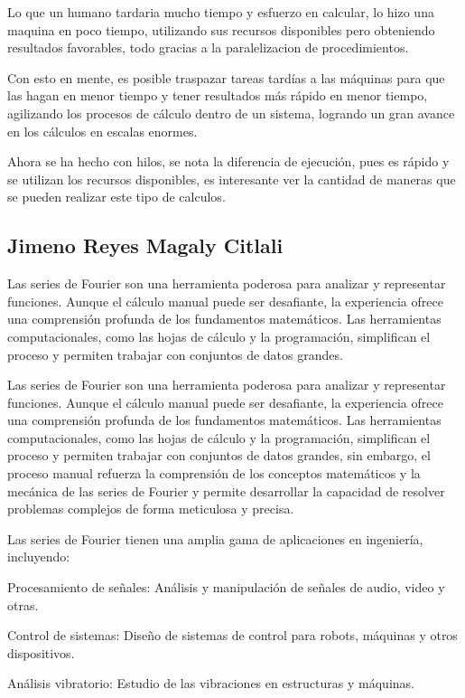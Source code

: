 Lo que un humano tardaria mucho tiempo y esfuerzo en calcular, lo hizo una maquina en poco tiempo, utilizando sus recursos disponibles pero obteniendo resultados favorables, todo gracias a la paralelizacion de procedimientos.

Con esto en mente, es posible traspazar tareas tardías a las máquinas para que las hagan en menor tiempo y tener resultados más rápido en menor tiempo, agilizando los procesos de cálculo dentro de un sistema, logrando un gran avance en los cálculos en escalas enormes.

Ahora se ha hecho con hilos, se nota la diferencia de ejecución, pues es rápido y se utilizan los recursos disponibles, es interesante ver la cantidad de maneras que se pueden realizar este tipo de calculos.

\subsection{\texorpdfstring{Jimeno Reyes Magaly Citlali }{Jimeno Reyes Magaly Citlali }}\label{jimeno-reyes-magaly-citlali}

Las series de Fourier son una herramienta poderosa para analizar y representar funciones. Aunque el cálculo manual puede ser desafiante, la experiencia ofrece una comprensión profunda de los fundamentos matemáticos. Las herramientas computacionales, como las hojas de cálculo y la programación, simplifican el proceso y permiten trabajar con conjuntos de datos grandes.

Las series de Fourier son una herramienta poderosa para analizar y representar funciones. Aunque el cálculo manual puede ser desafiante, la experiencia ofrece una comprensión profunda de los fundamentos matemáticos. Las herramientas computacionales, como las hojas de cálculo y la programación, simplifican el proceso y permiten trabajar con conjuntos de datos grandes, sin embargo, el proceso manual refuerza la comprensión de los conceptos matemáticos y la mecánica de las series de Fourier y permite desarrollar la capacidad de resolver problemas complejos de forma meticulosa y precisa.

Las series de Fourier tienen una amplia gama de aplicaciones en ingeniería, incluyendo:

Procesamiento de señales: Análisis y manipulación de señales de audio, video y otras.

Control de sistemas: Diseño de sistemas de control para robots, máquinas y otros dispositivos.

Análisis vibratorio: Estudio de las vibraciones en estructuras y máquinas.


